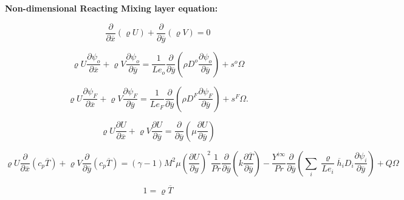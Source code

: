 \clearpage
\textbf{Non-dimensional Reacting Mixing layer equation:}

\begin{equation} 
\frac{\partial}{\partial \overline{x}}(\varrho U)+
\frac{\partial}{\partial \overline{y}}(\varrho V)=0
\label{mass2}
\end{equation} 

\begin{equation} 
\varrho U\frac{\partial \psi_{o}}{\partial\overline{x}}+
\varrho V\frac{\partial \psi_{o}}{\partial\overline{y}}=
\frac{1}{Le_o}\frac{\partial}{\partial \overline{y}}\left(\rho D^o\frac{\partial \psi_o}{\partial \overline{y}}\right)+
s^{o}\Omega
\end{equation} 

\begin{equation} 
\varrho U\frac{\partial \psi_{F}}{\partial\overline{x}}+
\varrho V\frac{\partial \psi_{F}}{\partial\overline{y}}=
\frac{1}{Le_F}\frac{\partial}{\partial \overline{y}}\left(\rho D^F\frac{\partial \psi_F}{\partial \overline{y}}\right)+
s^{F}\Omega.
\end{equation} 

\begin{equation} 
\varrho U\frac{\partial U}{\partial \overline{x}}+
\varrho V\frac{\partial U}{\partial \overline{y}}=
\frac{\partial}{\partial \overline{y}}\left(\mu\frac{\partial U}{\partial  \overline{y}}\right)
\end{equation} 

\begin{equation}
\varrho U\frac{\partial }{\partial \overline{x}}(c_p \overline{T})+
\varrho V\frac{\partial }{\partial \overline{y}}(c_p \overline{T})=
(\gamma-1)M^2\mu
\left(
\frac{\partial U}{\partial y}
\right)^2
\frac{1}{Pr}\frac{\partial}{\partial \overline{y}}\left(k\frac{\partial \overline{T}}{\partial \overline{y}}\right)
-
\frac{Y^{i\infty}}{Pr}
\frac{\partial }{\partial \overline{y}}
\left(
\sum_i\frac{\varrho}{Le_i}\overline{h}_i D_i\frac{\partial \psi_i}{\partial \overline{y}}
\right)
+
Q\Omega
\end{equation} 

\begin{equation}
1=\varrho\overline{T}
\label{g2}
\end{equation} 

